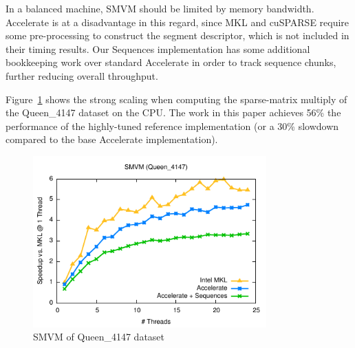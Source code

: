 In a balanced machine, SMVM should be limited by memory bandwidth. Accelerate is
at a disadvantage in this regard, since MKL and cuSPARSE require some
pre-processing to construct the segment descriptor, which is not included in
their timing results. Our Sequences implementation has some additional
bookkeeping work over standard Accelerate in order to track sequence chunks,
further reducing overall throughput.


Figure~\ref{fig:smvm_queen4147} shows the strong scaling when computing the
sparse-matrix multiply of the Queen\_4147 dataset on the CPU. The work in this
paper achieves 56\% the performance of the highly-tuned reference implementation
(or a 30\% slowdown compared to the base Accelerate implementation).



\begin{figure}
\centering
\includegraphics[width=0.8\textwidth]{benchmarks/smvm/figs/smvm.pdf}
\caption{SMVM of Queen\_4147 dataset}
\label{fig:smvm_queen4147}
\end{figure}

